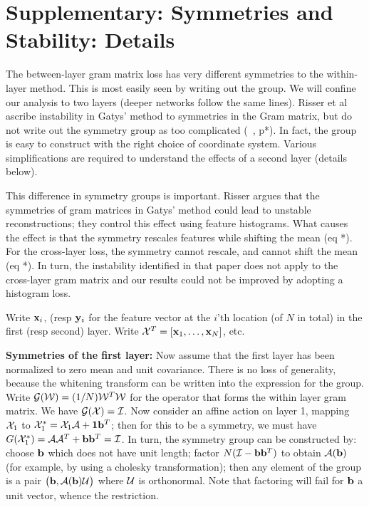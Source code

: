 \documentclass[runningheads]{llncs}
\newcommand{\vect}[1]{{\bf {#1}}}
\newcommand{\matx}[1]{{\cal {#1}}}
\begin{document}
\section*{Supplementary: Symmetries and Stability: Details}


The between-layer gram matrix loss has very different symmetries to the within-layer method.
This is most easily seen by writing out the group.  We will confine our analysis to two layers
(deeper networks follow the same lines).   Risser et al ascribe instability in Gatys' method to
symmetries in the Gram matrix, but do not write out the symmetry group as too complicated
(~\cite{}, p*).  In fact, the group is easy to construct with the right choice of coordinate system.
Various simplifications are required to understand the effects of a
second layer (details below).


This difference in symmetry groups is important.  Risser argues that
the symmetries of gram matrices in Gatys' method could lead to
unstable reconstructions; they control this effect using feature
histograms.  What causes the effect is that the symmetry rescales features while shifting the mean (eq *).  
For the cross-layer loss, the symmetry cannot rescale, and cannot shift the mean (eq *).  In turn, the instability
identified in that paper does not apply to the cross-layer gram matrix and our results could not be improved by adopting
a histogram loss.

Write $\vect{x}_{i}$, (resp $\vect{y}_i$ for the feature vector at the $i$'th location (of $N$ in total)
in the first (resp second) layer.  Write $\matx{X}^T=\left[\vect{x}_{1}, \ldots,
\vect{x}_{N}\right]$, etc.   

{\bf Symmetries of the first layer:} Now assume that the first layer has been normalized to zero mean and
unit covariance.  There is no loss of generality, because the whitening transform
can be written into the expression for the group. Write ${\cal
  G}(\matx{W})=(1/N)\matx{W}^T\matx{W}$ for the operator that forms
the within layer gram matrix. We have ${\cal G}(\matx{X})=\matx{I}$.   
Now consider an affine action on layer 1, mapping $\matx{X}_1$ to $\matx{X}_1^*=\matx{X}_1 \matx{A}+\vect{1}\vect{b}^T$; then for this to be a symmetry, we must have
$G(\matx{X}_1^*)= \matx{A}\matx{A}^T+\vect{b}\vect{b}^T=\matx{I}$.  In
turn, the symmetry group can be constructed by: choose $\vect{b}$
which does not have unit length; factor
$N(\matx{I}-\vect{b}\vect{b}^T)$ to obtain $\matx{A}(\vect{b})$ (for
example, by using a cholesky transformation); then any element of the
group is a pair $\left(\vect{b}, \matx{A}(\vect{b})\matx{U}\right)$
where $\matx{U}$ is orthonormal.  Note that factoring will fail for
$\vect{b}$ a unit vector, whence the restriction. 
\end{document}
